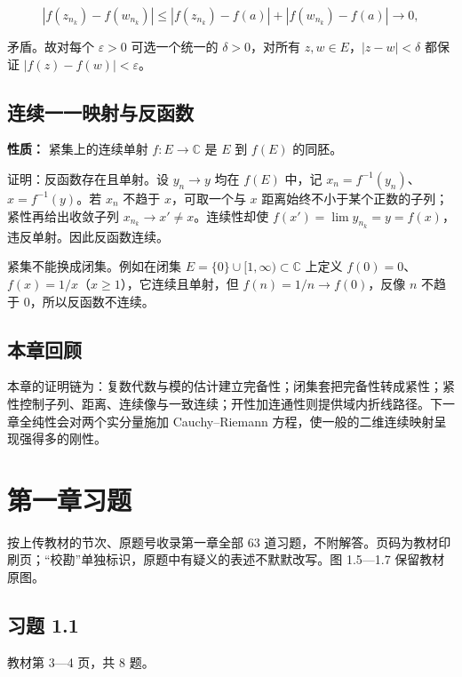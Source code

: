 \documentclass[11pt,a4paper]{article}
\begin{document}
\[
|f(z_{n_k})-f(w_{n_k})|
\le|f(z_{n_k})-f(a)|+|f(w_{n_k})-f(a)|\longrightarrow0,
\]

矛盾。故对每个 \(\varepsilon>0\) 可选一个统一的 \(\delta>0\)，对所有
\(z,w\in E\)，\(|z-w|<\delta\) 都保证 \(|f(z)-f(w)|<\varepsilon\)。

\subsection{连续一一映射与反函数}\label{ux8fdeux7eedux4e00ux4e00ux6620ux5c04ux4e0eux53cdux51fdux6570}

\textbf{性质：} 紧集上的连续单射 \(f:E\to\mathbb C\) 是 \(E\) 到
\(f(E)\) 的同胚。

证明：反函数存在且单射。设 \(y_n\to y\) 均在 \(f(E)\) 中，记
\(x_n=f^{-1}(y_n)\)、\(x=f^{-1}(y)\)。若 \(x_n\) 不趋于
\(x\)，可取一个与 \(x\) 距离始终不小于某个正数的子列；紧性再给出收敛子列
\(x_{n_k}\to x'\ne x\)。连续性却使
\(f(x')=\lim y_{n_k}=y=f(x)\)，违反单射。因此反函数连续。

紧集不能换成闭集。例如在闭集 \(E=\{0\}\cup[1,\infty)\subset\mathbb C\)
上定义 \(f(0)=0\)、\(f(x)=1/x\)（\(x\ge1\)），它连续且单射，但
\(f(n)=1/n\to f(0)\)，反像 \(n\) 不趋于 \(0\)，所以反函数不连续。

\subsection{本章回顾}\label{ux672cux7ae0ux56deux987e}

本章的证明链为：复数代数与模的估计建立完备性；闭集套把完备性转成紧性；紧性控制子列、距离、连续像与一致连续；开性加连通性则提供域内折线路径。下一章全纯性会对两个实分量施加
Cauchy--Riemann 方程，使一般的二维连续映射呈现强得多的刚性。

\clearpage\section*{第一章习题}
按上传教材的节次、原题号收录第一章全部 63
道习题，不附解答。页码为教材印刷页；``校勘''单独标识，原题中有疑义的表述不默默改写。图
1.5---1.7 保留教材原图。

\subsection{习题 1.1}\label{ux4e60ux9898-1.1}

教材第 3---4 页，共 8 题。
\end{document}
